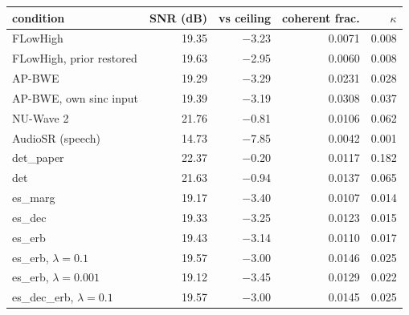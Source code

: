 \begin{tabular}{lrrrr}
\toprule
condition & SNR (dB) & vs ceiling & coherent frac. & $\kappa$ \\
\midrule
FLowHigh & 19.35 & $-$3.23 & 0.0071 & 0.008 \\
FLowHigh, prior restored & 19.63 & $-$2.95 & 0.0060 & 0.008 \\
AP-BWE & 19.29 & $-$3.29 & 0.0231 & 0.028 \\
AP-BWE, own sinc input & 19.39 & $-$3.19 & 0.0308 & 0.037 \\
NU-Wave 2 & 21.76 & $-$0.81 & 0.0106 & 0.062 \\
AudioSR (speech) & 14.73 & $-$7.85 & 0.0042 & 0.001 \\
det\_paper & 22.37 & $-$0.20 & 0.0117 & 0.182 \\
det & 21.63 & $-$0.94 & 0.0137 & 0.065 \\
es\_marg & 19.17 & $-$3.40 & 0.0107 & 0.014 \\
es\_dec & 19.33 & $-$3.25 & 0.0123 & 0.015 \\
es\_erb & 19.43 & $-$3.14 & 0.0110 & 0.017 \\
es\_erb, $\lambda{=}0.1$ & 19.57 & $-$3.00 & 0.0146 & 0.025 \\
es\_erb, $\lambda{=}0.001$ & 19.12 & $-$3.45 & 0.0129 & 0.022 \\
es\_dec\_erb, $\lambda{=}0.1$ & 19.57 & $-$3.00 & 0.0145 & 0.025 \\
\bottomrule
\end{tabular}
